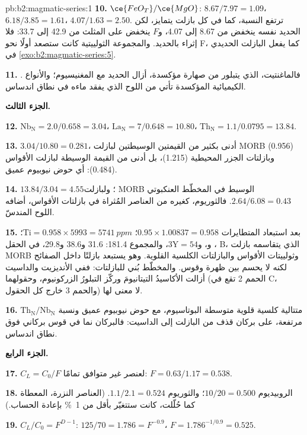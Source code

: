 \begin{solution}{pb:b2:magmatic-series:1}
\textbf{10.} $\ce{FeO_T}/\ce{MgO}$: $8.67/7.97 = 1.09$، $6.18/3.85 = 1.61$، $4.07/1.63 =
2.50$. ترتفع النسبة، كما في كل بازلت يتمايز، لكن الحديد نفسه
ينخفض من 8.67 إلى 4.07، و$F$ ينخفض على المثلث من 42.9 إلى 33.7: فلا إثراء
بالحديد. والمجموعة الثولييتية كانت ستصعد أولًا نحو F، كما يفعل البازلت الحديدي في
\cref{exo:b2:magmatic-series:5}.

\textbf{11.} . فالماغنتيت، الذي يتبلور من صهارة مؤكسدة،
أزال الحديد مع المغنيسيوم؛ والأنواع الكيميائية المؤكسدة تأتي من اللوح الذي يفقد ماءه في
نطاق اندساس.

\noindent\textbf{الجزء الثالث.}

\textbf{12.} $\mathrm{Nb_N} = 2.0/0.658 = 3.04$، $\mathrm{La_N} = 7/0.648 = 10.80$،
$\mathrm{Th_N} = 1.1/0.0795 = 13.84$.

\textbf{13.} $3.04/10.80 = 0.281$، أدنى بكثير من القيمتين الوسيطتين لبازلت MORB (0.956)
وبازلتات الجزر المحيطية (1.215)، بل أدنى من القيمة الوسيطة لبازلت الأقواس (0.484): أي حوض
نيوبيوم عميق.

\textbf{14.} $13.84/3.04 = 4.55$؛ ولبازلت MORB الوسيط في المخطّط العنكبوتي $2.64/6.08 =
0.43$. فالثوريوم، كغيره من العناصر المُثراة في بازلتات الأقواس، أضافه
اللوح المندسّ.

\textbf{15.}  بعد استبعاد المتطايرات $0.95\times1.00837 = 0.958$؛ $\mathrm{Ti} =
0.958\times5993 = \qty{5741}{ppm}$؛ ، و، و$3\mathrm Y = 54$، والمجموع 181.4:
31.6 و38.6 و29.8، في الحقل B، الذي يتقاسمه بازلت MORB وثولييتات الأقواس والبازلتات الكلسية القلوية.
وهو يستبعد بازلتًا داخل الصفائح لكنه لا يحسم بين ظهرة وقوس.
والمخطّط بُني للبازلتات: ففي الأنديزيت والداسيت أزالت الأكاسيدُ التيتانيومَ
وركّز التبلورُ الزركونيوم، وحقولهما (الحمم 2
تقع في C، والحمم 3 خارج كل الحقول) لا معنى لها.

\textbf{16.} متتالية كلسية قلوية متوسطة البوتاسيوم، مع حوض نيوبيوم عميق ونسبة
$\mathrm{Th_N}/\mathrm{Nb_N}$ مرتفعة، على بركان قذف من البازلت إلى الداسيت: فالبركان
نما في قوس بركاني فوق نطاق اندساس.

\noindent\textbf{الجزء الرابع.}

\textbf{17.} $C_L = C_0/F$ لعنصر غير متوافق تمامًا: $F = 0.63/1.17 =
0.538$.

\textbf{18.} الروبيديوم $10/20 = 0.500$؛ والثوريوم $1.1/2.1 = 0.524$. (العناصر
النزرة، المعطاة كما حُلّلت، كانت ستتغيّر بأقل من \qty{1}{\percent} بإعادة
الحساب.)

\textbf{19.} $C_L/C_0 = F^{D - 1}$: $125/70 = 1.786 = F^{-0.9}$، $F = 1.786^{-1/0.9} =
0.525$.


\end{solution}
